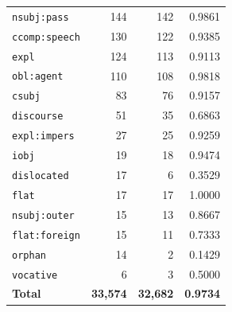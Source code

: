 \begin{table}[ht]
\begin{tabular}{lrrr}
\texttt{nsubj\!:\!pass} & 144 & 142 & 0.9861 \\
\texttt{ccomp\!:\!speech} & 130 & 122 & 0.9385 \\
\texttt{expl} & 124 & 113 & 0.9113 \\
\texttt{obl\!:\!agent} & 110 & 108 & 0.9818 \\
\texttt{csubj} & 83 & 76 & 0.9157 \\
\texttt{discourse} & 51 & 35 & 0.6863 \\
\texttt{expl\!:\!impers} & 27 & 25 & 0.9259 \\
\texttt{iobj} & 19 & 18 & 0.9474 \\
\texttt{dislocated} & 17 & 6 & 0.3529 \\
\texttt{flat} & 17 & 17 & 1.0000 \\
\texttt{nsubj\!:\!outer} & 15 & 13 & 0.8667 \\
\texttt{flat\!:\!foreign} & 15 & 11 & 0.7333 \\
\texttt{orphan} & 14 & 2 & 0.1429 \\
\texttt{vocative} & 6 & 3 & 0.5000 \\
\midrule
\textbf{Total} & \textbf{33,574} & \textbf{32,682} & \textbf{0.9734} \\
\bottomrule
\end{tabular}
\end{table}
